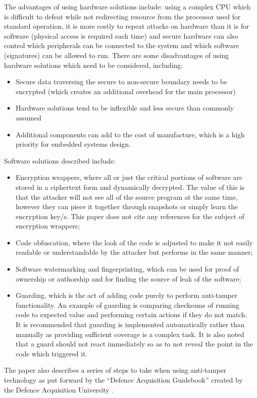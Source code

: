 The advantages of using hardware solutions include: using a complex CPU which is difficult to defeat while not redirecting resource from the processor used for standard operation, it is more costly to repeat attacks on hardware than it is for software (physical access is required each time) and secure hardware can also control which peripherals can be connected to the system and which software (signatures) can be allowed to run. There are some disadvantages of using hardware solutions which need to be considered, including:
\begin{itemize}
	\item Secure data traversing the secure to non-secure boundary needs to be encrypted (which creates an additional overhead for the main processor)
	\item Hardware solutions tend to be inflexible and less secure than commonly assumed
	\item Additional components can add to the cost of manufacture, which is a high priority for embedded systems design.
\end{itemize}
Software solutions described include:
\begin{itemize}
	\item Encryption wrappers, where all or just the critical portions of software are stored in a ciphertext form and dynamically decrypted. The value of this is that the attacker will not see all of the source program at the same time, however they can piece it together through snapshots or simply learn the encryption key/s. This paper does not cite any references for the subject of encryption wrappers;
	\item Code obfuscation, where the look of the code is adjusted to make it not easily readable or understandable by the attacker but performs in the same manner;
	\item Software watermarking and fingerprinting, which can be used for proof of ownership or authorship and for finding the source of leak of the software;
	\item Guarding, which is the act of adding code purely to perform anti-tamper functionality. An example of guarding is comparing checksums of running code to expected value and performing certain actions if they do not match. It is recommended that guarding is implemented automatically rather than manually as providing sufficient coverage is a complex task. It is also noted that a guard should not react immediately so as to not reveal the point in the code which triggered it.
\end{itemize}
The paper also describes a series of steps to take when using anti-tamper technology as put forward by the ``Defence Acquisition Guidebook'' created by the Defence Acquisition University \cite{DAU2011}.

